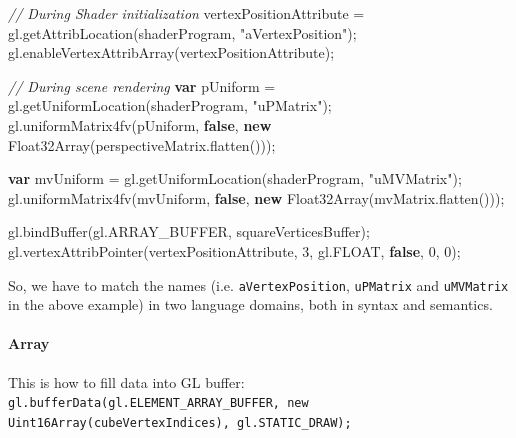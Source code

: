 \documentclass[]{article}
\newenvironment{Shaded}{}{}
\newcommand{\KeywordTok}[1]{\textcolor[rgb]{0.00,0.44,0.13}{\textbf{{#1}}}}
\newcommand{\DecValTok}[1]{\textcolor[rgb]{0.25,0.63,0.44}{{#1}}}
\newcommand{\StringTok}[1]{\textcolor[rgb]{0.25,0.44,0.63}{{#1}}}
\newcommand{\CommentTok}[1]{\textcolor[rgb]{0.38,0.63,0.69}{\textit{{#1}}}}
\newcommand{\OtherTok}[1]{\textcolor[rgb]{0.00,0.44,0.13}{{#1}}}
\newcommand{\FunctionTok}[1]{\textcolor[rgb]{0.02,0.16,0.49}{{#1}}}
\newcommand{\NormalTok}[1]{{#1}}
\begin{document}
\begin{Shaded}
\begin{Highlighting}[]
\CommentTok{// During Shader initialization}
\NormalTok{vertexPositionAttribute = }\OtherTok{gl}\NormalTok{.}\FunctionTok{getAttribLocation}\NormalTok{(shaderProgram, }\StringTok{"aVertexPosition"}\NormalTok{);}
\OtherTok{gl}\NormalTok{.}\FunctionTok{enableVertexAttribArray}\NormalTok{(vertexPositionAttribute);}

\CommentTok{// During scene rendering}
\KeywordTok{var} \NormalTok{pUniform = }\OtherTok{gl}\NormalTok{.}\FunctionTok{getUniformLocation}\NormalTok{(shaderProgram, }\StringTok{"uPMatrix"}\NormalTok{);}
\OtherTok{gl}\NormalTok{.}\FunctionTok{uniformMatrix4fv}\NormalTok{(pUniform, }\KeywordTok{false}\NormalTok{, }\KeywordTok{new} \FunctionTok{Float32Array}\NormalTok{(}\OtherTok{perspectiveMatrix}\NormalTok{.}\FunctionTok{flatten}\NormalTok{()));}

\KeywordTok{var} \NormalTok{mvUniform = }\OtherTok{gl}\NormalTok{.}\FunctionTok{getUniformLocation}\NormalTok{(shaderProgram, }\StringTok{"uMVMatrix"}\NormalTok{);}
\OtherTok{gl}\NormalTok{.}\FunctionTok{uniformMatrix4fv}\NormalTok{(mvUniform, }\KeywordTok{false}\NormalTok{, }\KeywordTok{new} \FunctionTok{Float32Array}\NormalTok{(}\OtherTok{mvMatrix}\NormalTok{.}\FunctionTok{flatten}\NormalTok{()));}

\OtherTok{gl}\NormalTok{.}\FunctionTok{bindBuffer}\NormalTok{(}\OtherTok{gl}\NormalTok{.}\FunctionTok{ARRAY_BUFFER}\NormalTok{, squareVerticesBuffer);}
\OtherTok{gl}\NormalTok{.}\FunctionTok{vertexAttribPointer}\NormalTok{(vertexPositionAttribute, }\DecValTok{3}\NormalTok{, }\OtherTok{gl}\NormalTok{.}\FunctionTok{FLOAT}\NormalTok{, }\KeywordTok{false}\NormalTok{, }\DecValTok{0}\NormalTok{, }\DecValTok{0}\NormalTok{);}
\end{Highlighting}
\end{Shaded}

So, we have to match the names (i.e. \texttt{aVertexPosition},
\texttt{uPMatrix} and \texttt{uMVMatrix} in the above example) in two
language domains, both in syntax and semantics.

\paragraph{Array}\label{array}

This is how to fill data into GL buffer:
\texttt{gl.bufferData(gl.ELEMENT\_ARRAY\_BUFFER, new Uint16Array(cubeVertexIndices), gl.STATIC\_DRAW);}
\end{document}
